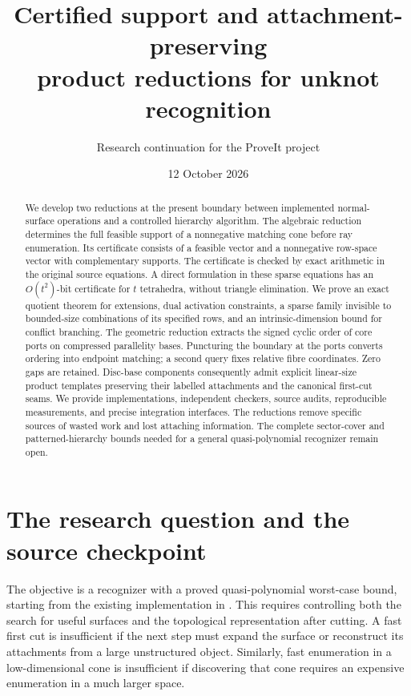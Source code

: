 \documentclass[11pt]{article}
\title{\color{navy}\bfseries Certified support and attachment-preserving\\
product reductions for unknot recognition}
\author{Research continuation for the ProveIt project}
\date{12 October 2026}
\theoremstyle{definition}
\theoremstyle{remark}
\begin{document}
\maketitle
\begin{abstract}
We develop two reductions at the present boundary between implemented
normal-surface operations and a controlled hierarchy algorithm.
The algebraic reduction determines the full feasible support of a
nonnegative matching cone before ray enumeration. Its certificate consists
of a feasible vector and a nonnegative row-space vector with complementary
supports. The certificate is checked by exact arithmetic in the original
source equations. A direct formulation in these sparse equations has an
$O(t^2)$-bit certificate for $t$ tetrahedra, without triangle elimination.
We prove an exact quotient theorem for extensions,
dual activation constraints, a sparse family invisible to bounded-size
combinations of its specified rows, and an intrinsic-dimension bound for
conflict branching.
The geometric reduction extracts the signed cyclic order of core ports
on compressed parallelity bases. Puncturing the boundary at the ports
converts ordering into endpoint matching; a second query fixes relative
fibre coordinates. Zero gaps are retained. Disc-base components consequently
admit explicit linear-size product templates preserving their labelled
attachments and the canonical first-cut seams. We provide implementations,
independent checkers, source audits, reproducible measurements, and precise
integration interfaces. The reductions remove specific sources of wasted
work and lost attaching information. The complete sector-cover and
patterned-hierarchy bounds needed for a general quasi-polynomial recognizer
remain open.
\end{abstract}
{\small\setlength{\parskip}{0pt}\tableofcontents}
\newpage

\section{The research question and the source checkpoint}
\label{sec:context}

The objective is a recognizer with a proved quasi-polynomial worst-case
bound, starting from the existing implementation in
. This requires controlling both the
search for useful surfaces and the topological representation after
cutting. A fast first cut is insufficient if the next step must expand the
surface or reconstruct its attachments from a large unstructured object.
Similarly, fast enumeration in a low-dimensional cone is insufficient if
discovering that cone requires an expensive enumeration in a much larger
space.
\end{document}
